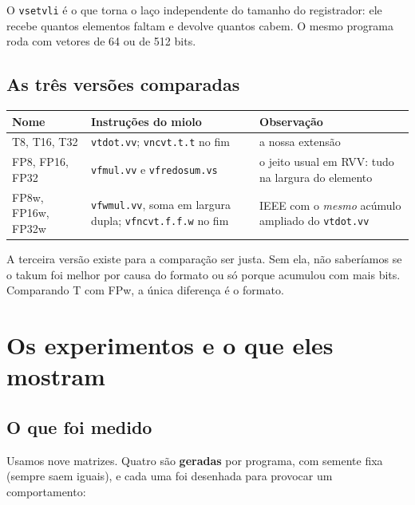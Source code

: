 \documentclass[11pt,a4paper]{article}
\newcommand{\code}[1]{\texttt{#1}}
\begin{document}
O \code{vsetvli} é o que torna o laço independente do tamanho do registrador: ele recebe quantos
elementos faltam e devolve quantos cabem. O mesmo programa roda com vetores de 64 ou de 512 bits.

\subsection{As três versões comparadas}

\begin{center}
\begin{tabularx}{\linewidth}{l>{\raggedright\arraybackslash}p{4.6cm}X}
\toprule
Nome & Instruções do miolo & Observação \\
\midrule
T8, T16, T32 & \code{vtdot.vv}; \code{vncvt.t.t} no fim & a nossa extensão \\
FP8, FP16, FP32 & \code{vfmul.vv} e \code{vfredosum.vs} & o jeito usual em RVV: tudo na largura do
  elemento \\
FP8w, FP16w, FP32w & \code{vfwmul.vv}, soma em largura dupla; \code{vfncvt.f.f.w} no fim & IEEE com o
  \emph{mesmo} acúmulo ampliado do \code{vtdot.vv} \\
\bottomrule
\end{tabularx}
\end{center}

A terceira versão existe para a comparação ser justa. Sem ela, não saberíamos se o takum foi melhor por
causa do formato ou só porque acumulou com mais bits. Comparando T com FPw, a única diferença é o formato.

\section{Os experimentos e o que eles mostram}
\label{sec:exp}

\subsection{O que foi medido}

Usamos nove matrizes. Quatro são \textbf{geradas} por programa, com semente fixa (sempre saem iguais), e
cada uma foi desenhada para provocar um comportamento:
\end{document}
